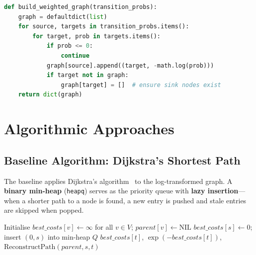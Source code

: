 \begin{lstlisting}[language=Python, caption={Graph construction (\texttt{src/graph\_builder.py})}, label=lst:graph_build]
def build_weighted_graph(transition_probs):
    graph = defaultdict(list)
    for source, targets in transition_probs.items():
        for target, prob in targets.items():
            if prob <= 0:
                continue
            graph[source].append((target, -math.log(prob)))
            if target not in graph:
                graph[target] = []  # ensure sink nodes exist
    return dict(graph)
\end{lstlisting}

\section{Algorithmic Approaches}

\subsection{Baseline Algorithm: Dijkstra's Shortest Path}

The baseline applies Dijkstra's algorithm~\citep{dijkstra1959} to the log-transformed graph. A \textbf{binary min-heap} (\texttt{heapq}) serves as the priority queue with \textbf{lazy insertion}---when a shorter path to a node is found, a new entry is pushed and stale entries are skipped when popped.

\begin{algorithm}[H]
\caption{Dijkstra on Transformed Probabilities~\citep{dijkstra1959,cormen2009}}\label{alg:baseline}
\SetAlgoLined
{}
Initialise $\mathit{best\_costs}[v] \leftarrow \infty$ for all $v \in V$; $\mathit{parent}[v] \leftarrow \mathrm{NIL}$\;
$\mathit{best\_costs}[s] \leftarrow 0$; insert $(0, s)$ into min-heap $Q$\;
\Return $\mathit{best\_costs}[t]$, $\exp(-\mathit{best\_costs}[t])$, $\mathrm{ReconstructPath}(\mathit{parent}, s, t)$\;
\end{algorithm}


